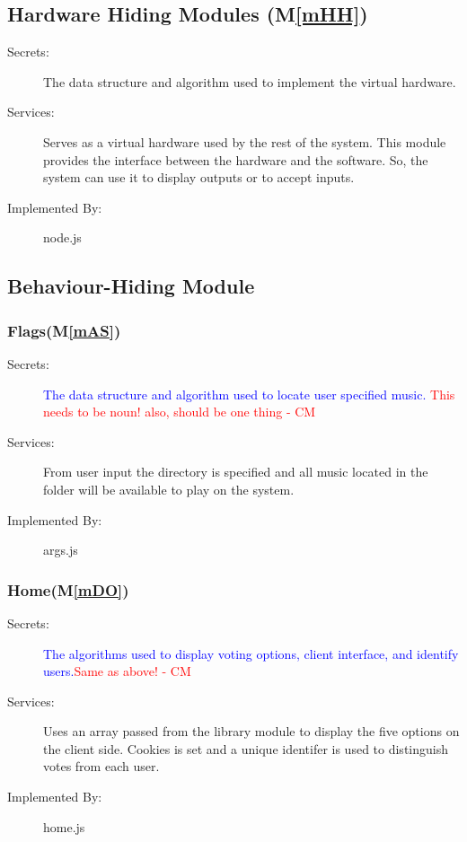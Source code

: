 \documentclass[12pt, titlepage]{article}
\newcommand{\mref}[1]{M\ref{#1}}
\begin{document}
\subsection{Hardware Hiding Modules (\mref{mHH})}


\begin{description}
\item[Secrets:]The data structure and algorithm used to implement the virtual
 hardware.
\item[Services:]Serves as a virtual hardware used by the rest of the
 system. This module provides the interface between the hardware and the
 software. So, the system can use it to display outputs or to accept inputs.
\item[Implemented By:] node.js
\end{description}


\subsection{Behaviour-Hiding Module}

\subsubsection{Flags(\mref{mAS})}


\begin{description}
\item[Secrets:]\textcolor{blue}{The data structure and algorithm used to locate user specified music.} \textcolor{red}{This needs to be noun! also, should be one thing - CM}
\item[Services:]From user input the directory is specified and all music located in the folder will be available to play on the system.
\item[Implemented By:] args.js
\end{description}

\subsubsection{Home(\mref{mDO})}


\begin{description}
\item[Secrets:]\textcolor{blue}{The algorithms used to display voting options, client interface, and identify users.}\textcolor{red}{Same as above! - CM}
\item[Services:]Uses an array passed from the library module to display the five options on the client side. Cookies is set and a unique identifer is used to distinguish votes from each user.
\item[Implemented By:] home.js
\end{description}
\end{document}
